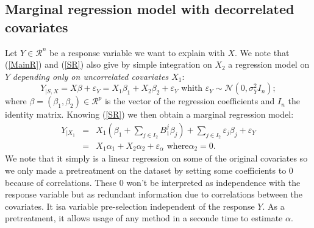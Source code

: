 \documentclass[11pt,a4paper]{article}
\begin{document}
\subsection{Marginal regression model with decorrelated covariates}
Let $Y \in \mathcal{R}^n$ be a response variable we want to explain with $X$.
We note that (\ref{MainR}) and (\ref{SR}) also give by simple integration on $X_2$ a regression model on $Y$ {\it depending only on uncorrelated covariates $X_1$}:
		\begin{equation}
			Y_{|S,X}=X\beta+\varepsilon_Y =X_1\beta_1+X_2\beta_2+\varepsilon_Y \textrm{ whith } \varepsilon_Y \sim \mathcal{N}(0,\sigma^2_YI_n);	\label{MainR}
		\end{equation}
		where $\beta=(\beta_1,\beta_2) \in  \mathcal{R}^p$ is the vector of the regression coefficients and $I_n$ the identity matrix. 
Knowing (\ref{SR}) we then obtain a marginal regression model:
\begin{eqnarray}
	Y_{|X_1}&=&X_1 (\beta_{1}+ \sum_{j \in I_2}B^{j}_{1}\beta_{j})+  \sum_{j \in I_2}\varepsilon_{j}\beta_{j}+\varepsilon_Y \label{Trueexpl} \\
		&=&X_1 \alpha_1 + X_2\alpha_2 + \varepsilon_{\alpha} \textrm{ where} \alpha_2  = 0.
\end{eqnarray}
We note that it simply is a linear regression on some of the original covariates so we only made a pretreatment on the dataset by setting some coefficients to $0$ because of correlations. These $0$ won't be interpreted as independence with the response variable but as redundant information due to correlations between the covariates. It isa variable pre-selection independent of the response $Y$. As a pretreatment, it allows usage of any method in a seconde time to estimate $\alpha$.
\end{document}
